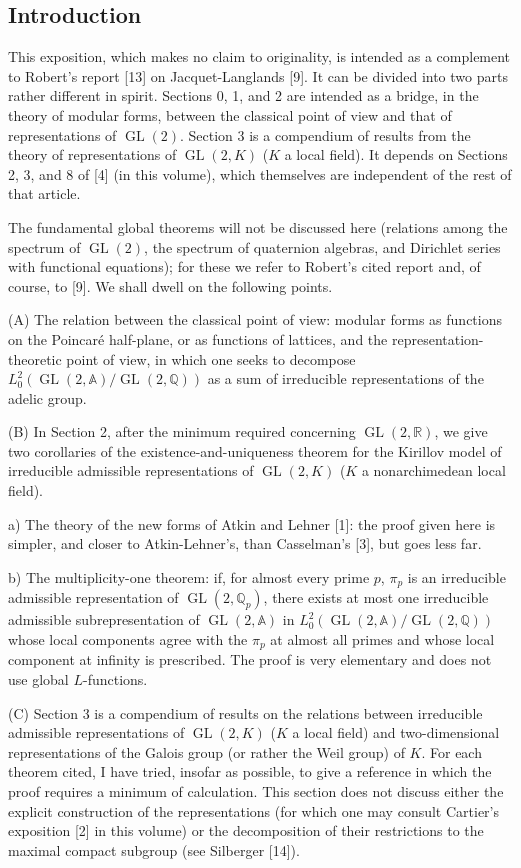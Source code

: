 \documentclass[10pt,a4paper]{article}
\providecommand{\GL}{\operatorname{GL}}
\providecommand{\R}{\mathbb R}
\providecommand{\Q}{\mathbb Q}
\providecommand{\A}{\mathbb A}
\begin{document}
\clearpage
{}
\hypertarget{authority-2}{}
\subsection*{Introduction}
This exposition, which makes no claim to originality, is intended as a complement to Robert's report [13] on Jacquet-Langlands [9]. It can be divided into two parts rather different in spirit. Sections 0, 1, and 2 are intended as a bridge, in the theory of modular forms, between the classical point of view and that of representations of $\GL(2)$. Section 3 is a compendium of results from the theory of representations of $\GL(2,K)$ ($K$ a local field). It depends on Sections 2, 3, and 8 of [4] (in this volume), which themselves are independent of the rest of that article.

The fundamental global theorems will not be discussed here (relations among the spectrum of $\GL(2)$, the spectrum of quaternion algebras, and Dirichlet series with functional equations); for these we refer to Robert's cited report and, of course, to [9]. We shall dwell on the following points.

(A) The relation between the classical point of view: modular forms as functions on the Poincaré half-plane, or as functions of lattices, and the representation-theoretic point of view, in which one seeks to decompose $L_0^2(\GL(2,\A)/\GL(2,\Q))$ as a sum of irreducible representations of the adelic group.

(B) In Section 2, after the minimum required concerning $\GL(2,\R)$, we give two corollaries of the existence-and-uniqueness theorem for the Kirillov model of irreducible admissible representations of $\GL(2,K)$ ($K$ a nonarchimedean local field).

a) The theory of the new forms of Atkin and Lehner [1]: the proof given here is simpler, and closer to Atkin-Lehner's, than Casselman's [3], but goes less far.

b) The multiplicity-one theorem: if, for almost every prime $p$, $\pi_p$ is an irreducible admissible representation of $\GL(2,\Q_p)$, there exists at most one irreducible admissible subrepresentation of $\GL(2,\A)$ in $L_0^2(\GL(2,\A)/\GL(2,\Q))$ whose local components agree with the $\pi_p$ at almost all primes and whose local component at infinity is prescribed. The proof is very elementary and does not use global $L$-functions.

\clearpage
{}
\hypertarget{authority-3}{}
(C) Section 3 is a compendium of results on the relations between irreducible admissible representations of $\GL(2,K)$ ($K$ a local field) and two-dimensional representations of the Galois group (or rather the Weil group) of $K$. For each theorem cited, I have tried, insofar as possible, to give a reference in which the proof requires a minimum of calculation. This section does not discuss either the explicit construction of the representations (for which one may consult Cartier's exposition [2] in this volume) or the decomposition of their restrictions to the maximal compact subgroup (see Silberger [14]).
\end{document}
